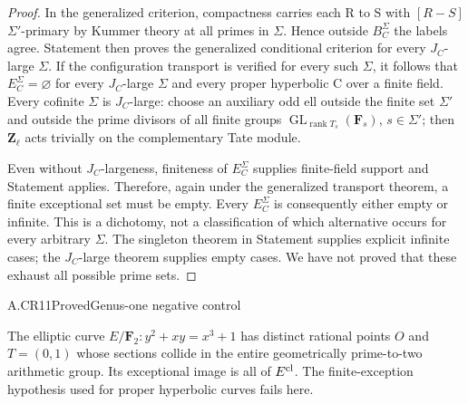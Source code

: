 \begin{proof}
In the generalized criterion, compactness carries each R to S with \([R-S]\) \({\Sigma}'\)-primary by Kummer theory at all primes in \({\Sigma}\). Hence outside \(B_C^{\Sigma}\) the labels agree. Statement  then proves the generalized conditional criterion for every \(J_C\)-large \({\Sigma}\). If the configuration transport is verified for every such \({\Sigma}\), it follows that \(E_C^{\Sigma}=\varnothing\) for every \(J_C\)-large \({\Sigma}\) and every proper hyperbolic C over a finite field. Every cofinite \({\Sigma}\) is \(J_C\)-large: choose an auxiliary odd ell outside the finite set \({\Sigma}'\) and outside the prime divisors of all finite groups \(\operatorname{GL}_{\operatorname{rank}T_s}(\mathbf F_s)\), \(s{\in}{\Sigma}'\); then \(\mathbf{Z}_\ell\) acts trivially on the complementary Tate module.

Even without \(J_C\)-largeness, finiteness of \(E_C^{\Sigma}\) supplies finite-field support and Statement  applies. Therefore, again under the generalized transport theorem, a finite exceptional set must be empty. Every \(E_C^{\Sigma}\) is consequently either empty or infinite. This is a dichotomy, not a classification of which alternative occurs for every arbitrary \({\Sigma}\). The singleton theorem in Statement  supplies explicit infinite cases; the \(J_C\)-large theorem supplies empty cases. We have not proved that these exhaust all possible prime sets.


\end{proof}

\begin{claim}{A.CR11}{Proved}{Genus-one negative control}

The elliptic curve $E/\mathbf F_2:y^2+xy=x^3+1$ has distinct
rational points $O$ and $T=(0,1)$ whose sections collide in the
entire geometrically prime-to-two arithmetic group. Its exceptional
image is all of $E^{\mathrm{cl}}$. The finite-exception hypothesis used for
proper hyperbolic curves fails here.

\end{claim}

